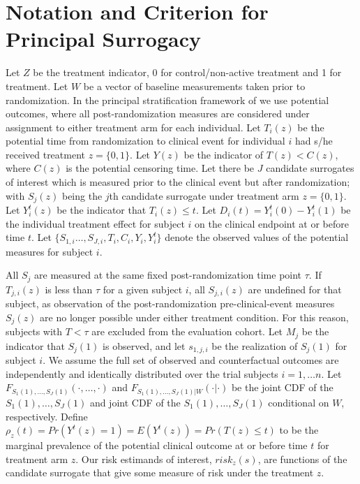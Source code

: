 \documentclass[times, doublespace]{simauth}
\begin{document}
\section{Notation and Criterion for Principal Surrogacy} \label{DEF}
Let $Z$ be the treatment indicator, 0 for control/non-active treatment and 1 for treatment. Let $W$ be a vector of baseline measurements taken prior to randomization. In the principal stratification framework of \citet{Frangakis02} we use potential outcomes, where all post-randomization measures are considered under assignment to either treatment arm for each individual. Let $T_i(z)$ be the potential time from randomization to clinical event for individual $i$ had s/he received treatment $z=\{0,1\}$. Let $Y(z)$ be the indicator of $T(z)<C(z)$, where $C(z)$ is the potential censoring time. Let there be $J$ candidate surrogates of interest which is measured prior to the clinical event but after randomization; with $S_{j}(z)$ being the $j$th candidate surrogate under treatment arm $z=\{0,1\}$. Let $Y_{i}^{t}(z)$ be the indicator that $T_i(z)\leq t$. Let $D_i(t)=Y_{i}^{t}(0)-Y_{i}^{t}(1)$ be the individual treatment effect for subject $i$ on the clinical endpoint at or before time $t$. Let $\{S_{1,i}\ldots,S_{J,i}, T_i, C_i, Y_i, Y_{i}^{t} \}$ denote the observed values of the potential measures for subject $i$. 

All $S_j$ are measured at the same fixed post-randomization time point $\tau$. If $T_{j,i}(z)$ is less than $\tau$ for a given subject $i$, all $S_{j,i}(z)$ are undefined for that subject, as observation of the post-randomization pre-clinical-event measures $S_{j}(z)$ are no longer possible under either treatment condition. For this reason, subjects with $T< \tau$ are excluded from the evaluation cohort. Let $M_j$ be the indicator that $S_{j}(1)$ is observed, and let $s_{1,j,i}$ be the realization of $S_{j}(1)$ for subject $i$. We assume the full set of observed and counterfactual outcomes are independently and identically distributed over the trial subjects $i= 1, \ldots n$. Let $F_{S_1(1), \ldots, S_J(1)}(\cdot,\dots,\cdot)$ and $F_{S_1(1), \ldots, S_J(1)|W}(\cdot|\cdot)$ be the joint CDF of the $S_1(1), \ldots, S_J(1)$ and joint CDF of the $S_1(1), \ldots, S_J(1)$ conditional on $W$, respectively. Define $\rho_z(t)=Pr(Y^t(z)=1)=E(Y^t(z))=Pr(T(z)\leq t)$ to be the marginal prevalence of the potential clinical outcome at or before time $t$ for treatment arm $z$. Our risk estimands of interest, $risk_z(s)$, are functions of the candidate surrogate that give some measure of risk under the treatment $z$. 
\end{document}
